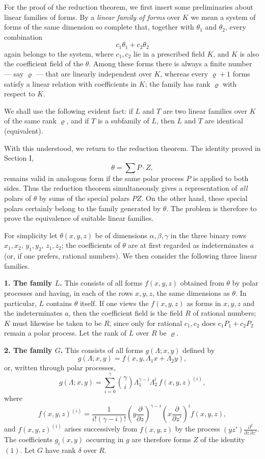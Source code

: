 \documentclass[11pt]{article}
\begin{document}
For the proof of the reduction theorem, we first insert some preliminaries about linear families of forms. By a \emph{linear family of forms} over \(K\) we mean a system of forms of the same dimension so complete that, together with \(\theta_1\) and \(\theta_2\), every combination
\[
c_1\theta_1+c_2\theta_2
\]
again belongs to the system, where \(c_1,c_2\) lie in a prescribed field \(K\), and \(K\) is also the coefficient field of the \(\theta\). Among these forms there is always a finite number --- say \(\varrho\) --- that are linearly independent over \(K\), whereas every \(\varrho+1\) forms satisfy a linear relation with coefficients in \(K\); the family has rank \(\varrho\) with respect to \(K\).

We shall use the following evident fact: if \(L\) and \(T\) are two linear families over \(K\) of the same rank \(\varrho\), and if \(T\) is a subfamily of \(L\), then \(L\) and \(T\) are identical (equivalent).

With this understood, we return to the reduction theorem. The identity proved in Section I,
\[
\theta=\sum P\cdot Z,
\tag{1}
\]
remains valid in analogous form if the same polar process \(P\) is applied to both sides. Thus the reduction theorem simultaneously gives a representation of \emph{all} polars of \(\theta\) by sums of the special polars \(PZ\). On the other hand, these special polars certainly belong to the family generated by \(\theta\). The problem is therefore to prove the equivalence of suitable linear families.

For simplicity let \(\theta(x,y,z)\) be of dimensions \(\alpha,\beta,\gamma\) in the three binary rows \(x_1,x_2\), \(y_1,y_2\), \(z_1,z_2\); the coefficients of \(\theta\) are at first regarded as indeterminates \(a\) (or, if one prefers, rational numbers). We then consider the following three linear families.

\medskip
\noindent\textbf{1. The family \(L\).}
This consists of all forms \(f(x,y,z)\) obtained from \(\theta\) by polar processes and having, in each of the rows \(x,y,z\), the same dimensions as \(\theta\). In particular, \(L\) contains \(\theta\) itself. If one views the \(f(x,y,z)\) as forms in \(x,y,z\) and the indeterminates \(a\), then the coefficient field is the field \(R\) of rational numbers; \(K\) must likewise be taken to be \(R\), since only for rational \(c_1,c_2\) does \(c_1P_1+c_2P_2\) remain a polar process. Let the rank of \(L\) over \(R\) be \(\varrho\).

\medskip
\noindent\textbf{2. The family \(G\).}
This consists of all forms \(g(\Lambda;x,y)\) defined by
\[
g(\Lambda;x,y)=f(x,y,\Lambda_1x+\Lambda_2y),
\]
or, written through polar processes,
\[
g(\Lambda;x,y)=\sum_{i=0}^{\gamma}\binom{\gamma}{i}\Lambda_1^{\gamma-i}\Lambda_2^i\, f(x,y,z)^{(i)},
\]
where
\[
f(x,y,z)^{(i)}=
\frac{1}{i!(\gamma-i)!}
\left(y\frac{\partial}{\partial z}\right)^{\gamma-i}
\left(x\frac{\partial}{\partial z'}\right)^i
f(x,y,z),
\]
and \(f(x,y,z)^{(i)}\) arises successively from \(f(x,y,z)\) by the process \((yz')\frac{\partial^2}{\partial z\,\partial z'}\).
The coefficients \(g_i(x,y)\) occurring in \(g\) are therefore forms \(Z\) of the identity \((1)\). Let \(G\) have rank \(\delta\) over \(R\).
\end{document}
